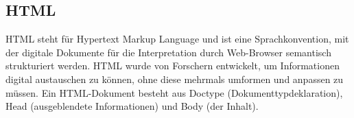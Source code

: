 \subsection{HTML}
HTML steht für Hypertext Markup Language und ist eine Sprachkonvention, mit der digitale Dokumente für die Interpretation durch Web-Browser semantisch strukturiert werden. HTML wurde von Forschern entwickelt, um Informationen digital austauschen zu können, ohne diese mehrmals umformen und anpassen zu müssen. Ein HTML-Dokument besteht aus Doctype (Dokumenttypdeklaration), Head (ausgeblendete Informationen) und Body (der Inhalt). 
